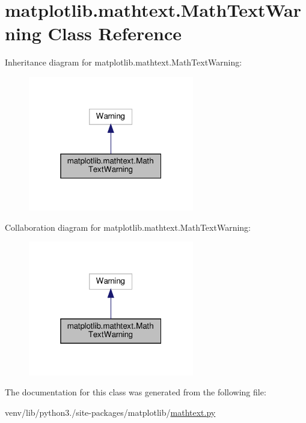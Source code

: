 \hypertarget{classmatplotlib_1_1mathtext_1_1MathTextWarning}{}\section{matplotlib.\+mathtext.\+Math\+Text\+Warning Class Reference}
\label{classmatplotlib_1_1mathtext_1_1MathTextWarning}


Inheritance diagram for matplotlib.\+mathtext.\+Math\+Text\+Warning\+:
\nopagebreak
\begin{figure}[H]
\begin{center}
\leavevmode
\includegraphics[width=205pt]{classmatplotlib_1_1mathtext_1_1MathTextWarning__inherit__graph}
\end{center}
\end{figure}


Collaboration diagram for matplotlib.\+mathtext.\+Math\+Text\+Warning\+:
\nopagebreak
\begin{figure}[H]
\begin{center}
\leavevmode
\includegraphics[width=205pt]{classmatplotlib_1_1mathtext_1_1MathTextWarning__coll__graph}
\end{center}
\end{figure}


The documentation for this class was generated from the following file\+:\begin{DoxyCompactItemize}
\item 
venv/lib/python3./site-\/packages/matplotlib/\hyperlink{mathtext_8py}{mathtext.\+py}\end{DoxyCompactItemize}
